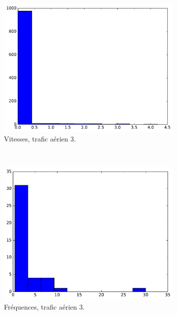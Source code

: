 	\begin{figure}
		\begin{subfigure}[t]{\subImgWclicks}
			\centering
			\includegraphics[width=\textwidth]{figures/ch3/hkg_speed}
			\caption{Vitesses, trafic aérien 3.}
			\label{fig:hkg_speed}
		\end{subfigure}
		~
		\begin{subfigure}[t]{\subImgWclicks}
			\centering
			\includegraphics[width=\textwidth]{figures/ch3/hkg_frequency}
			\caption{Fréquences, trafic aérien 3.}
			\label{fig:hkg_frequency}
		\end{subfigure}
		~
		\begin{subfigure}[t]{\subImgWclicks}

\end{subfigure}
\end{figure}
